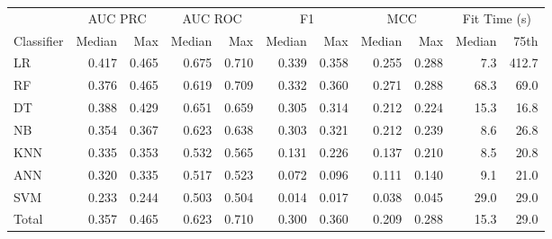 \begin{tabular}{lrrrrrrrrrr}
\toprule
{} & \multicolumn{2}{c}{AUC PRC}        & \multicolumn{2}{c}{AUC ROC}        &     \multicolumn{2}{c}{F1}       &    \multicolumn{2}{c}{MCC}        & \multicolumn{2}{c}{Fit Time (s)}         \\
{Classifier} &    Median &    Max &    Median &    Max &   Median &    Max &   Median &    Max &         Median &     75th \\
\midrule
LR       &   0.417 &  0.465 &   0.675 &  0.710 &  0.339 &  0.358 &  0.255 &  0.288 &        7.3 &  412.7 \\
RF             &   0.376 &  0.465 &   0.619 &  0.709 &  0.332 &  0.360 &  0.271 &  0.288 &       68.3 &   69.0 \\
DT             &   0.388 &  0.429 &   0.651 &  0.659 &  0.305 &  0.314 &  0.212 &  0.224 &       15.3 &   16.8 \\
NB               &   0.354 &  0.367 &   0.623 &  0.638 &  0.303 &  0.321 &  0.212 &  0.239 &        8.6 &   26.8 \\
KNN       &   0.335 &  0.353 &   0.532 &  0.565 &  0.131 &  0.226 &  0.137 &  0.210 &        8.5 &   20.8 \\
ANN &   0.320 &  0.335 &   0.517 &  0.523 &  0.072 &  0.096 &  0.111 &  0.140 &        9.1 &   21.0 \\
SVM    &   0.233 &  0.244 &   0.503 &  0.504 &  0.014 &  0.017 &  0.038 &  0.045 &       29.0 &   29.0 \\
Total                     &   0.357 &  0.465 &   0.623 &  0.710 &  0.300 &  0.360 &  0.209 &  0.288 &       15.3 &   29.0 \\
\bottomrule
\end{tabular}
